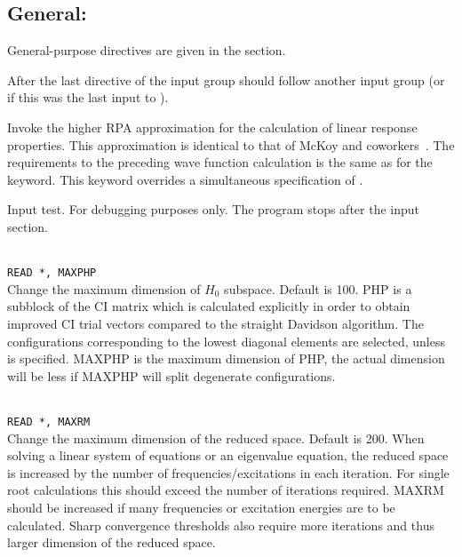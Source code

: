 \subsection{General: }

General-purpose directives are given in the  section.

After the last directive of the  input group
should follow another {} input group
(or  if this was the last input to \dalton).

\begin{description}

\item{}
Invoke the higher RPA approximation for the calculation of linear
response properties.
This approximation is identical to that of McKoy
and coworkers~\cite{jrtsvmjcp58,tsjrvmjcp58}. The requirements to the
preceding wave function
calculation is the same as for the  keyword.
This keyword overrides a simultaneous specification of .

\item{}
Input test. For debugging purposes only. The program stops after the
input section.

\item{}\\
\verb|READ *, MAXPHP|\\
Change the maximum dimension of $H_0$ subspace.   Default is 100.
PHP is a subblock of the CI matrix which is calculated explicitly
in order to obtain improved CI trial vectors compared to the
straight Davidson algorithm\cite{erdjcp17}.  The configurations
corresponding to
the lowest diagonal elements are selected, unless  is
specified. MAXPHP is the maximum dimension of PHP, the
actual dimension will be less if MAXPHP will split degenerate configurations.

\item{}\\
\verb|READ *, MAXRM |\\
Change the maximum dimension of the reduced space. Default is 200.
When solving a linear system of equations or an eigenvalue equation,
the reduced space is increased by the number of
frequencies/excitations in each iteration. For single root
calculations this should exceed the number of iterations required.
MAXRM should be increased if many frequencies or excitation energies
are to be calculated.
Sharp convergence thresholds also require
more iterations and thus larger dimension of the reduced space.


\end{description}
